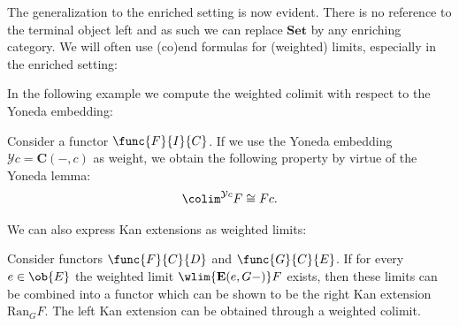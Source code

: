     The generalization to the enriched setting is now evident. There is no reference to the terminal object left and as such we can replace $\mathbf{Set}$ by any enriching category. We will often use (co)end formulas for (weighted) limits, especially in the enriched setting:

    In the following example we compute the weighted colimit with respect to the Yoneda embedding:
    \begin{example}
        Consider a functor $\func{F}{I}{C}$. If we use the Yoneda embedding $\mathcal{Y}c = \mathbf{C}(-, c)$ as weight, we obtain the following property by virtue of the Yoneda lemma:
        \begin{gather}
            \label{cat:weighted_hom_colimit}
            \colim^{\mathcal{Y}c}F\cong Fc.
        \end{gather}
    \end{example}

    We can also express Kan extensions as weighted limits:
    \begin{property}
        Consider functors $\func{F}{C}{D}$ and $\func{G}{C}{E}$. If for every $e\in\ob{E}$ the weighted limit $\wlim{\mathbf{E}(e, G-)}F$ exists, then these limits can be combined into a functor which can be shown to be the right Kan extension $\text{Ran}_GF$. The left Kan extension can be obtained through a weighted colimit.
    \end{property}


